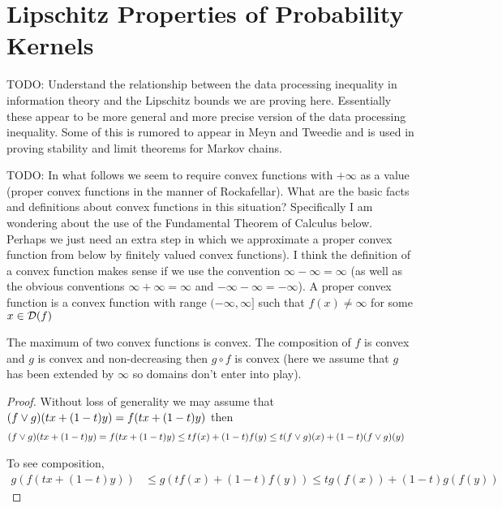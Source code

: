 \section{Lipschitz Properties of Probability Kernels}

TODO: Understand the relationship between the data processing inequality in information theory and the Lipschitz bounds we are proving here.  Essentially these appear to be more general and more precise version of the data processing inequality.  Some of this is rumored to appear in Meyn and Tweedie and is used in proving stability and limit theorems for Markov chains.

TODO: In what follows we seem to require convex functions with
$+\infty$ as a value (proper convex functions in the manner of
Rockafellar).  What are the basic facts and definitions about convex
functions in this situation?  Specifically I am wondering about the
use of the Fundamental Theorem of Calculus below.  Perhaps we just
need an extra step in which we approximate a proper convex function
from below by finitely valued convex functions).  I think the
definition of a convex function makes sense if we use the convention
$\infty - \infty = \infty$ (as well as the obvious conventions $\infty + \infty = \infty$ and $-\infty - \infty = -\infty$).  A proper convex function is a convex function with range $(-\infty, \infty]$ such that $f(x) \neq \infty$ for some $x \in \mathcal{D}(f)$

\begin{prop}The maximum of two convex functions is convex.  The composition of $f$ is convex and $g$ is convex and non-decreasing then $g \circ f$ is convex (here we assume that $g$ has been extended by $\infty$ so domains don't enter into play).
\end{prop}
\begin{proof}
Without loss of generality we may assume that $(f \vee g)(tx + (1-t) y) = f(tx + (1-t) y)$ then
\begin{align*}
(f \vee g)(tx + (1-t) y) &= f(tx + (1-t) y) \leq t f(x) + (1-t) f(y) \leq  t (f \vee g)(x) + (1-t) (f \vee g)(y) 
\end{align*}

To see composition,
\begin{align*}
g(f(tx + (1-t) y)) &\leq g(tf(x) + (1-t) f(y)) \leq t g(f(x)) + (1-t) g(f(y)) 
\end{align*}
\end{proof}

